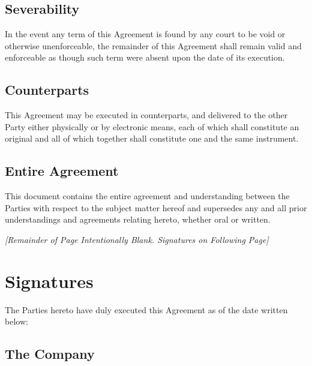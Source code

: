 \documentclass[a4paper,12pt]{article} %
\begin{document}
\subsection{Severability}

In the event any term of this Agreement is found by any court to be void or otherwise unenforceable, the remainder of this Agreement shall remain valid and enforceable as though such term were absent upon the date of its execution.

\subsection{Counterparts}

This Agreement may be executed in counterparts, and delivered to the other Party either physically or by electronic means, each of which shall constitute an original and all of which together shall constitute one and the same instrument.

\subsection{Entire Agreement}

This document contains the entire agreement and understanding between the Parties with respect to the subject matter hereof and supersedes any and all prior understandings and agreements relating hereto, whether oral or written.\\

\begin{center}
\textit{[Remainder of Page Intentionally Blank. Signatures on Following Page]}
\end{center}

\pagebreak



\section{Signatures}


The Parties hereto have duly executed this Agreement as of the date written below:


\subsection*{The Company} %
\end{document}
